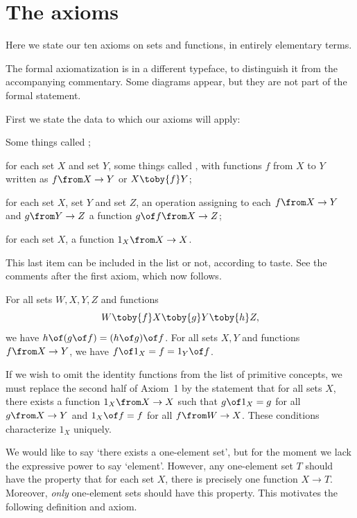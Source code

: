 \documentclass[12pt]{article}
\begin{document}
\section{The axioms} 
\label{sec:axioms}


Here we state our ten axioms on sets and functions, in entirely elementary
terms.

The formal axiomatization is in a \fmlon different typeface\fmloff, to
distinguish it from the accompanying commentary.  Some diagrams appear, but
they are not part of the formal statement.

First we state the data to which our axioms will apply:
% 
\fmlon
\begin{myitemize}
\item Some things called ;

\item for each set $X$ and set $Y$, some things called , with functions $f$ from $X$ to $Y$ written as $f\from
X \to Y$ or $X \toby{f} Y$;

\item for each set $X$, set $Y$ and set $Z$, an operation assigning to each
$f\from X \to Y$ and $g\from Y \to Z$ a function $g\of f\from X \to Z$;

\item for each set $X$, a function $1_X\from X \to X$.
\end{myitemize}
\fmloff

This last item can be included in the list or not, according to taste.  See
the comments after the first axiom, which now follows.


% 
\begin{axiom}{1}
For all sets $W, X, Y, Z$ and functions 
\[
W \toby{f} X \toby{g} Y \toby{h} Z,
\]
we have $h \of (g\of f) = (h \of g) \of f$.  For all sets $X, Y$ and functions
$f\from X \to Y$, we have $f \of 1_X = f = 1_Y \of f$.
\end{axiom}

If we wish to omit the identity functions from the list of primitive
concepts, we must replace the second half of Axiom~1 by the statement
that for all sets $X$, there exists a function $1_X \from X \to X$ such
that $g \of 1_X = g$ for all $g\from X \to Y$ and $1_X \of f = f$ for all
$f\from W \to X$.  These conditions characterize $1_X$ uniquely.


% 
We would like to say `there exists a one-element set', but for the moment
we lack the expressive power to say `element'.  However, any one-element
set $T$ should have the property that for each set $X$, there is precisely
one function $X \to T$.  Moreover, \emph{only} one-element sets should have
this property.  This motivates the following definition and axiom.
\end{document}
